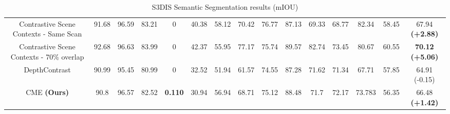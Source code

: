 \documentclass[10pt,twocolumn,letterpaper]{article}
\begin{document}
\begin{table}[t!]
{\begin{tabular}{ c | c c c c c c c c c c c c c | c }
            Contrastive Scene Contexts - Same Scan    & 91.68          & 96.59          & 83.21          & 0              & 40.38          & 58.12          & 70.42          & 76.77          & 87.13          & 69.33          & 68.77          & 82.34          & 58.45          & 67.94 \textbf{(+2.88)}          \\
            Contrastive Scene Contexts - 70\% overlap & 92.68          & 96.63          & 83.99          & 0              & 42.37          & 55.95          & 77.17          & 75.74          & 89.57          & 82.74          & 73.45          & 80.67          & 60.55          & \textbf{70.12} \textbf{(+5.06)} \\
            DepthContrast                             & 90.99          & 95.45          & 80.99          & 0              & 32.52          & 51.94          & 61.57          & 74.55          & 87.28          & 71.62          & 71.34          & 67.71          & 57.85          & 64.91 (-0.15)                   \\
            CME \textbf{(Ours)}                       & 90.8           & 96.57          & 82.52          & \textbf{0.110} & 30.94          & 56.94          & 68.71          & 75.12          & 88.48          & 71.7           & 72.17          & 73.783         & 56.35          & 66.48 \textbf{(+1.42)}          \\
        \end{tabular}
    }
    \caption{S3DIS Semantic Segmentation results (mIOU)}
\end{table}
\end{document}
